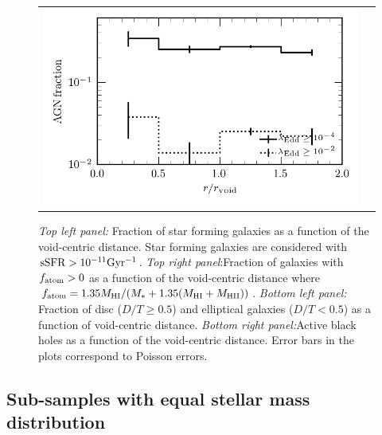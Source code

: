 \documentclass[a4paper,fleqn,usenatbib,letter]{mnras}
\begin{document}
\begin{figure}
\begin{tabular}{cc}
	\includegraphics[width=\columnwidth]{plots_parent_sample/ActiveAGN_fraction.png} \\
	  
	\end{tabular}	
    \caption{ \textit{Top left panel:} Fraction of star forming galaxies as a function of the void-centric distance. Star  forming galaxies are considered with $\rm sSFR>10^{-11} Gyr^{-1}$. \textit{Top right panel}:Fraction of galaxies with $f_{\rm atom}>0$ as a function of the void-centric distance  where $f_{\rm atom}= 1.35 M_{\rm HI}/ (M_{*} +1.35 (M_{\rm HI} +M_{\rm HII}))$. \textit{Bottom left panel:} Fraction of disc ($D/T\geq 0.5$) and elliptical  galaxies ($D/T<0.5$) as a function of void-centric distance. \textit{Bottom right panel:}Active black holes as a function of the void-centric distance. Error bars in the plots correspond to Poisson errors. }
    \label{fig:fractionvoids}
\end{figure}



\subsection{Sub-samples with equal stellar mass distribution}
\end{document}

